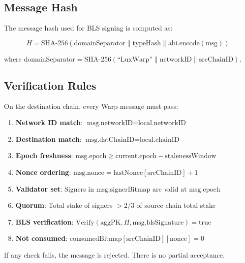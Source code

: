 \subsection{Message Hash}

The message hash used for BLS signing is computed as:

$$H = \text{SHA-256}(\text{domainSeparator} \| \text{typeHash} \| \text{abi.encode}(\text{msg}))$$

where $\text{domainSeparator} = \text{SHA-256}(\text{``LuxWarp''} \| \text{networkID} \| \text{srcChainID})$.

\subsection{Verification Rules}

On the destination chain, every Warp message must pass:

\begin{enumerate}[leftmargin=2em]
\item \textbf{Network ID match}: $\text{msg.networkID} = \text{local.networkID}$
\item \textbf{Destination match}: $\text{msg.dstChainID} = \text{local.chainID}$
\item \textbf{Epoch freshness}: $\text{msg.epoch} \geq \text{current.epoch} - \text{stalenessWindow}$
\item \textbf{Nonce ordering}: $\text{msg.nonce} = \text{lastNonce}[\text{srcChainID}] + 1$
\item \textbf{Validator set}: Signers in $\text{msg.signerBitmap}$ are valid at $\text{msg.epoch}$
\item \textbf{Quorum}: Total stake of signers $> 2/3$ of source chain total stake
\item \textbf{BLS verification}: $\text{Verify}(\text{aggPK}, H, \text{msg.blsSignature}) = \text{true}$
\item \textbf{Not consumed}: $\text{consumedBitmap}[\text{srcChainID}][\text{nonce}] = 0$
\end{enumerate}

If any check fails, the message is rejected. There is no partial acceptance.

